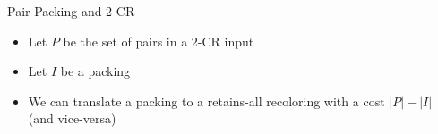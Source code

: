 \begin{frame}{Pair Packing and 2-CR}

\begin{itemize}

\item 
Let $P$ be the set of pairs in a 2-CR input

\pause\item
Let $I$ be a packing

\pause\item 
We can translate a packing to a retains-all recoloring with a cost 
$|P| - |I|$ (and vice-versa) 

\end{itemize}

\end{frame}